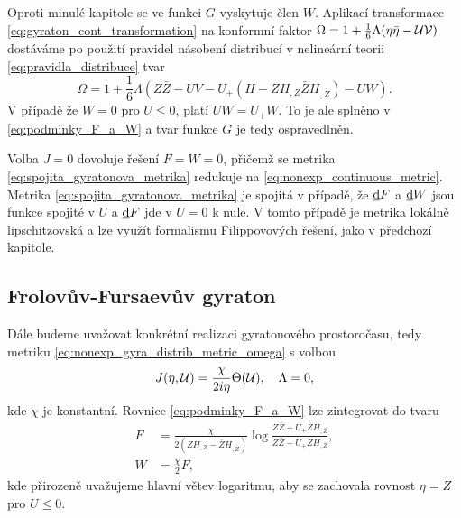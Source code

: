 Oproti minulé kapitole se ve funkci $G$ vyskytuje člen $W$. Aplikací transformace \eqref{eq:gyraton_cont_transformation}
na konformní faktor $\Omega = 1 + \frac{1}{6} \Lambda (\eta \bar{\eta} - \mathcal{U} \mathcal{V})$ dostáváme po použití pravidel násobení distribucí v nelineární teorii \eqref{eq:pravidla_distribuce} tvar
\begin{equation}
    \Omega = 1 + \frac{1}{6} \Lambda \left(Z \bar{Z} - UV - U_+ (H - Z H_{,Z} \bar{Z} H_{,\bar{Z}}) - UW \right).
\end{equation}
V případě že $W = 0$ pro $U \leq 0$, platí $UW = U_+ W$. To je ale splněno v \eqref{eq:podminky_F_a_W} a tvar funkce $G$ je tedy ospravedlněn.

Volba $J=0$ dovoluje řešení $F = W = 0$, přičemž se metrika \eqref{eq:spojita_gyratonova_metrika} redukuje na \eqref{eq:nonexp_continuous_metric}.
Metrika \eqref{eq:spojita_gyratonova_metrika} je spojitá v případě, že $\underline{\mathrm{d}}F$ a $\underline{\mathrm{d}}W$ jsou funkce spojité v $U$ a $\underline{\mathrm{d}}F$
jde v $U=0$ k nule. V tomto případě je metrika lokálně lipschitzovská a lze využít formalismu Filippovových řešení, jako v předchozí kapitole.


\subsection{Frolovův-Fursaevův gyraton}
Dále budeme uvažovat konkrétní realizaci gyratonového prostoročasu, tedy metriku \eqref{eq:nonexp_gyra_distrib_metric_omega} s volbou
\begin{equation}
    J(\eta , \mathcal{U}) = \frac{\chi}{2 i \eta} \Theta( \mathcal{U} ),~~~ \Lambda = 0,
\end{equation}
kde $\chi$ je konstantní. Rovnice \eqref{eq:podminky_F_a_W} lze zintegrovat do tvaru
\begin{equation}
    \label{eq:zintegrovane1}
    \begin{split}
        F &= \frac{\chi}{2(Z H_{,Z}-\bar{Z}H_{,\bar{Z}})} \log \frac{Z\bar{Z}+U_{+}\bar{Z}H_{,\bar{Z}}}{Z\bar{Z}+U_{+}ZH_{,Z}}, \\
        W &= \frac{\chi}{2}F,
    \end{split}
\end{equation}
kde přirozeně uvažujeme hlavní větev logaritmu, aby se zachovala rovnost $\eta = Z$ pro $U \leq 0$.

